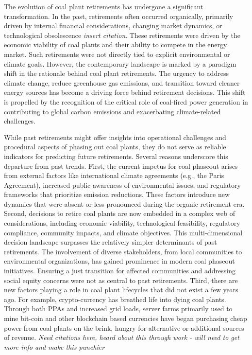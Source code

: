 The evolution of coal plant retirements has undergone a significant transformation. 
In the past, retirements often occurred organically, primarily driven by internal financial considerations, 
changing market dynamics, or technological obsolescence \textit{insert citation}. 
These retirements were driven by the economic viability of coal plants and their ability to compete 
in the energy market. Such retirements were not directly tied to explicit environmental or climate goals. 
However, the contemporary landscape is marked by a paradigm shift in the rationale behind coal plant retirements. 
The urgency to address climate change, reduce greenhouse gas emissions, and transition toward cleaner energy 
sources has become a driving force behind retirement decisions. This shift is propelled by the recognition of 
the critical role of coal-fired power generation in contributing to global carbon emissions and exacerbating 
climate-related challenges.

While past retirements might offer insights into operational challenges and procedural aspects of phasing out 
coal plants, they do not serve as reliable indicators for predicting future retirements. Several reasons underscore 
this departure from past trends. First, the current impetus for coal phaseout arises from external factors like 
international climate agreements (e.g., the Paris Agreement), increased public awareness of environmental issues, 
and regulatory frameworks that prioritize emission reductions. These factors introduce new dynamics that were 
absent or less pronounced during the organic retirement era. Second, decisions to retire coal plants are now embedded 
in a complex web of considerations, including economic viability, technological feasibility, regulatory compliance, 
community impacts, and climate objectives. This multi-dimensional decision landscape surpasses the relatively simpler 
determinants of past retirements. The involvement of diverse stakeholders, from local communities to environmental 
organizations, has gained prominence in modern coal phaseout initiatives. Ensuring a just transition for affected 
communities and addressing social equity concerns were not as central to past retirements. Third, there are new factors playing
a role in coal plant lifecycles that did not exist a few years ago. For example, crypto-currency has breathed life into dying coal plants. 
Through both PPAs and increased grid loads, server farms primarily used to 
mine bit-coin and other blockchain based currencies have began purchasing cheap power from coal plants on the brink, hungry 
for alternative or additional sources of revenue. \textit{Need citations here, heard about this through work - will need 
to get more info and make this punchier}

